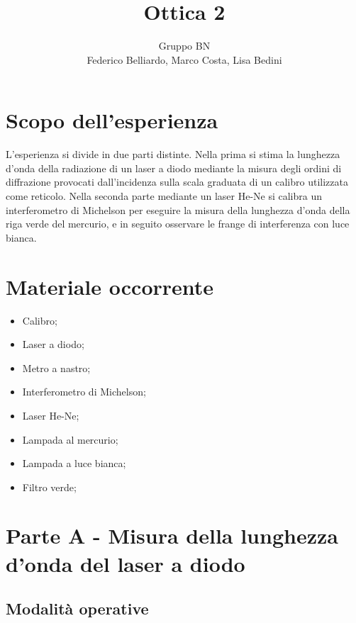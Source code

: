 \documentclass[10pt,a4paper]{article}
\author{Gruppo BN \\ Federico Belliardo, Marco Costa, Lisa Bedini}
\title{Ottica 2}
\begin{document}
\maketitle
\section{Scopo dell'esperienza}
L'esperienza si divide in due parti distinte. Nella prima si stima la lunghezza d'onda della radiazione di un laser a diodo mediante la misura degli ordini di diffrazione provocati dall'incidenza sulla scala graduata di un calibro utilizzata come reticolo. Nella seconda parte mediante un laser He-Ne si calibra un interferometro di Michelson per eseguire la misura della lunghezza d'onda della riga verde del mercurio, e in seguito osservare le frange di interferenza con luce bianca.

\section{Materiale occorrente}
\begin{itemize}
\item Calibro;
\item Laser a diodo;
\item Metro a nastro;
\item Interferometro di Michelson;
\item Laser He-Ne;
\item Lampada al mercurio;
\item Lampada a luce bianca;
\item Filtro verde;
\end{itemize}

\section{Parte A - Misura della lunghezza d'onda del laser a diodo}
\subsection{Modalità operative}
\end{document}
